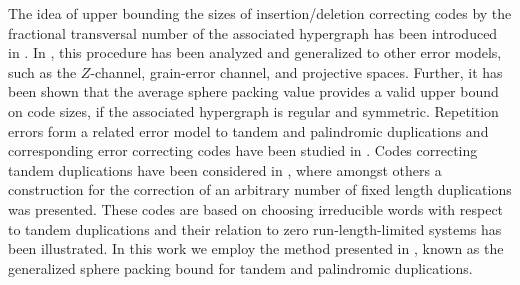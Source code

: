 \documentclass[a4paper]{llncs}
\begin{document}
	The idea of upper bounding the sizes of insertion/deletion correcting codes by the fractional transversal number of the associated hypergraph has been introduced in \cite{Kulkarni13}.
	In \cite{Fazeli15}, this procedure has been analyzed and generalized to other error models, such as the $Z$-channel, grain-error channel, and projective spaces. Further, it has been shown that the average sphere packing value provides a valid upper bound on code sizes, if the associated hypergraph is regular and symmetric. Repetition errors form a related error model to tandem and palindromic duplications and corresponding error correcting codes have been studied in \cite{Dolecek10}. Codes correcting tandem duplications have been considered in \cite{Jain16}, where amongst others a construction for the correction of an arbitrary number of fixed length duplications was presented. These codes are based on choosing irreducible words with respect to tandem duplications and their relation to zero run-length-limited systems has been illustrated. In this work we employ the method presented in \cite{Fazeli15}, known as the generalized sphere packing bound for tandem and palindromic duplications.
\end{document}
